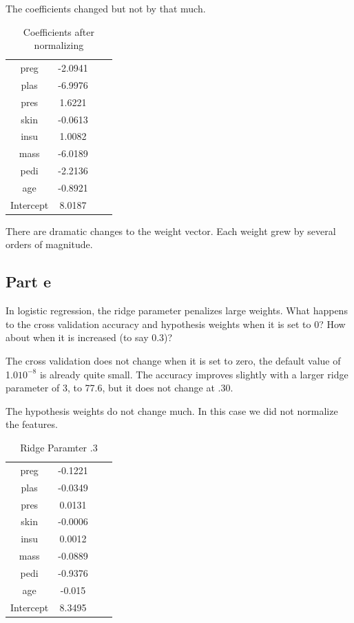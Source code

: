 \documentclass{article}
\begin{document}
The coefficients changed but not by that much. 
\begin{table}[H]
    \begin{center}
     \caption{Coefficients after normalizing}
    \begin{tabular}{|c|c|c|c|}
   \hline
preg          &        -2.0941\\
plas             &    -6.9976\\
pres               &    1.6221\\
skin              &  -0.0613\\
insu               &   1.0082\\
mass              &    -6.0189\\
pedi             &    -2.2136\\
age            &       -0.8921\\
Intercept      &        8.0187\\ %
\hline
    \end{tabular}
    \end{center}
\end{table}

There are dramatic changes to the weight vector. Each weight grew by several orders of magnitude. 

\subsection{Part e}
In logistic regression, the ridge parameter penalizes large weights. What happens to the cross validation accuracy and hypothesis weights when it is set to 0? How about when it is increased (to say 0.3)?

The cross validation does not change when it is set to zero, the default value of 1.0$10^{-8}$ is already quite small. The accuracy improves slightly with a larger ridge parameter of 3, to 77.6, but it does not change at .30. 

The hypothesis weights do not change much. In this case we did not normalize the features. 

\begin{table}[H]
    \begin{center}
    \caption{Ridge Paramter .3}
    \begin{tabular}{|c|c|c|c|}
   \hline
preg          &        -0.1221\\
plas             &     -0.0349\\
pres               &    0.0131\\
skin              &   -0.0006\\
insu               &    0.0012\\
mass              &    -0.0889\\
pedi             &     -0.9376\\
age            &        -0.015\\
Intercept      &        8.3495\\ %
\hline
    \end{tabular}
    \end{center}
\end{table}
\end{document}
